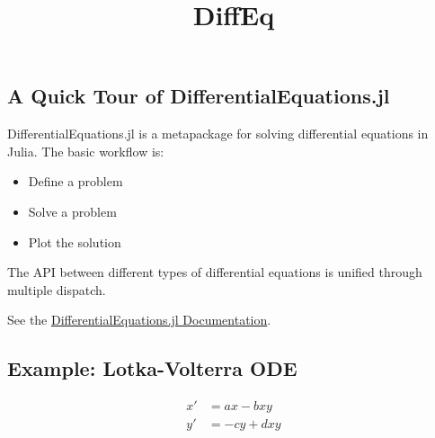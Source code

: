 \documentclass[11pt]{article}
\title{DiffEq}
\begin{document}
    
    
    \maketitle
    
    

    
    \subsection{A Quick Tour of
DifferentialEquations.jl}\label{a-quick-tour-of-differentialequations.jl}

DifferentialEquations.jl is a metapackage for solving differential
equations in Julia. The basic workflow is:

\begin{itemize}
\itemsep1pt\parskip0pt
\item
  Define a problem
\item
  Solve a problem
\item
  Plot the solution
\end{itemize}

The API between different types of differential equations is unified
through multiple dispatch.

See the
\href{http://docs.juliadiffeq.org/latest/index.html}{DifferentialEquations.jl
Documentation}.

    \subsection{Example: Lotka-Volterra
ODE}\label{example-lotka-volterra-ode}

\[\begin{align}
x' &= ax - bxy\\
y' &= -cy + dxy
\end{align}\]
\end{document}

